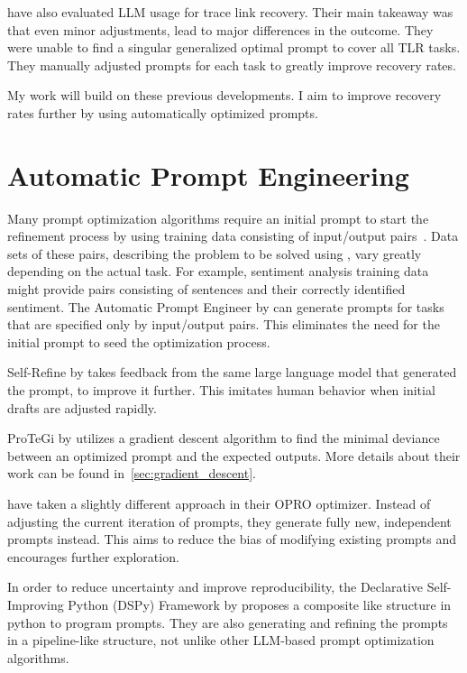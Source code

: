  have also evaluated LLM usage for trace link recovery.
Their main takeaway was that even minor adjustments,  lead to major differences in the outcome.
They were unable to find a singular generalized optimal prompt to cover all TLR tasks.
They manually adjusted prompts for each task to greatly improve recovery rates.

My work will build on these previous developments. 
I aim to improve recovery rates further by using automatically optimized prompts.


\section{Automatic Prompt Engineering}
\label{related:sec:ape}
Many prompt optimization algorithms require an initial prompt to start the refinement process by using training data consisting of input/output pairs~\cite{ramnath2025SystematicSurvey}. 
Data sets of these pairs, describing the problem to be solved using \LLMs, vary greatly depending on the actual task.
For example, sentiment analysis training data might provide pairs consisting of sentences and their correctly identified sentiment.
The Automatic Prompt Engineer by  can generate prompts for tasks that are specified only by input/output pairs.
This eliminates the need for the initial prompt to seed the optimization process.

Self-Refine by  takes feedback from the same large language model that generated the prompt, to improve it further.
This imitates human behavior when initial drafts are adjusted rapidly.

ProTeGi by  utilizes a gradient descent algorithm to find the minimal deviance between an optimized prompt and the expected outputs.
More details about their work can be found in~\ref{sec:gradient_descent}.

 have taken a slightly different approach in their OPRO optimizer.
Instead of adjusting the current iteration of prompts, they generate fully new, independent prompts instead. This aims to reduce the bias of modifying existing prompts and encourages further exploration.

In order to reduce uncertainty and improve reproducibility, the Declarative Self-Improving Python (DSPy) Framework by  proposes a composite like structure in python to program prompts.
They are also generating and refining the prompts in a pipeline-like structure, not unlike other LLM-based prompt optimization algorithms.

